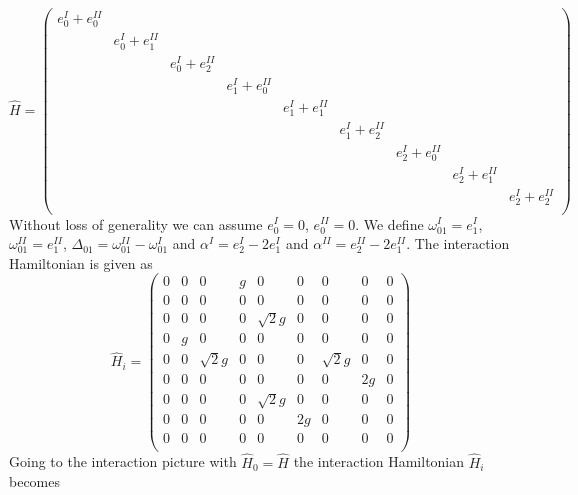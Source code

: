%
\begin{equation}
\hat{H} = \left( \begin{array}{ccccccccc}
										e_0^I+e_0^{II} \\
										& e_{0}^I+e_1^{II} \\
										& & e_{0}^I+e_2^{II} \\
										& & & e_{1}^I+e_0^{II} \\
										& & & & e_{1}^I+e_1^{II} \\
										& & & & & e_{1}^I+e_2^{II} \\
										& & & & & & e_{2}^{I}+e_0^{II} \\
										& & & & & & & e_{2}^{I}+e_1^{II} \\
										& & & & & & & & e_{2}^{I}+e_2^{II} \\
									\end{array}
					\right)
\end{equation}
%
Without loss of generality we can assume $e_0^{I}=0$, $e_0^{II}=0$. We define $\omega_{01}^I=e_1^{I}$, $\omega_{01}^{II}=e_1^{II}$, $\Delta_{01} = \omega_{01}^{II}-\omega_{01}^I$ and $\alpha^I = e_2^I-2e_1^{I}$ and $\alpha^{II} = e_2^{II}-2e_1^{II}$. The interaction Hamiltonian is given as
%
\begin{equation}
\hat{H}_i = \left(
			\begin{array}{ccccccccc}
				0 & 0 & 0 & g & 0 & 0 & 0 & 0 & 0 \\
				0 & 0 & 0 & 0 & 0 & 0 & 0 & 0 & 0 \\
				0 & 0 & 0 & 0 & \sqrt{2}g & 0 & 0 & 0 & 0 \\
				0 & g & 0 & 0 & 0 & 0 & 0 & 0 & 0 \\
				0 & 0 & \sqrt{2}g & 0 & 0 & 0 & \sqrt{2}g & 0 & 0 \\
				0 & 0 & 0 & 0 & 0 & 0 & 0 & 2g & 0 \\
				0 & 0 & 0 & 0 & \sqrt{2}g & 0 & 0 & 0 & 0 \\
				0 & 0 & 0 & 0 & 0 & 2g & 0 & 0 & 0 \\
				0 & 0 & 0 & 0 & 0 & 0 & 0 & 0 & 0 \\
			\end{array}
		\right)
\end{equation}
%
Going to the interaction picture with $\hat{H}_0 = \hat{H}$ the interaction Hamiltonian $\hat{H}_i$ becomes
%
